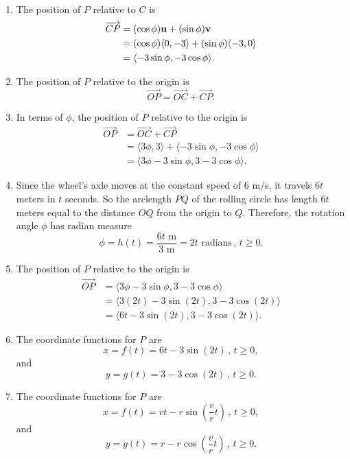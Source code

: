\documentclass{ximera}
\begin{document}
\begin{question}
\begin{explanation}
\begin{enumerate}
\item The position of $P$ relative to $C$ is
\begin{align*}
 \overrightarrow{CP} &= (\cos\phi) {\bf u} + (\sin\phi){\bf v} \\
                               &=  (\cos\phi) \langle 0,-3 \rangle + (\sin\phi) \langle -3, 0  \rangle \\
                               &= \langle -3\sin\phi , -3\cos\phi \rangle .
\end{align*}

\item The position of $P$ relative to the origin is
\[
   \overrightarrow{OP} =  \overrightarrow{OC} +  \overrightarrow{CP}.
\]

\item In terms of $\phi$, the position of $P$ relative to the origin is
\begin{align*}
   \overrightarrow{OP} &=  \overrightarrow{OC} +  \overrightarrow{CP} \\
                                 &= \langle  3\phi , 3 \rangle +  \langle -3\sin\phi , -3\cos\phi \rangle \\
                                 &= \langle 3\phi - 3\sin\phi , 3 - 3\cos\phi \rangle.
\end{align*}

\item Since the wheel's axle moves at the constant speed of $6$ m/s, it travels $6t$ meters in $t$ seconds. So the arclength $PQ$ of the rolling circle has length $6t$ meters equal to the distance $OQ$ from the origin to $Q$. Therefore, the rotation angle $\phi$ 
has radian measure
\[
      \phi = h(t) = \frac{6t \text{ m}}{3\text{ m}} = 2t \text{ radians} \, , \, t\geq 0.
\]

\item The position of $P$ relative to the origin is
\begin{align*}
   \overrightarrow{OP} &= \langle 3\phi - 3\sin\phi , 3 - 3\cos\phi \rangle \\
                                 &= \langle 3\left( 2t \right) - 3\sin\left( 2t\right) , 3 - 3\cos (2t) \rangle \\
                                  &= \langle 6t - 3\sin\left( 2t\right) , 3 - 3\cos (2t) \rangle .
\end{align*}

\item The coordinate functions for $P$ are
\[
    x = f(t) = 6t - 3\sin\left( 2t\right) \, , \, t\geq 0,
\]
and
\[
   y = g(t) = 3 - 3\cos (2t)  \, , \, t\geq 0.
\]

\item The coordinate functions for $P$ are
\[
    x = f(t) = vt - r\sin\left( \frac{v}{r}t\right) \, , \, t\geq 0,
\]
and
\[
   y = g(t) = r - r\cos \left( \frac{v}{r}t \right)  \, , \, t\geq 0.
\]
\end{enumerate}
\end{explanation}
\end{question}
\end{document}
